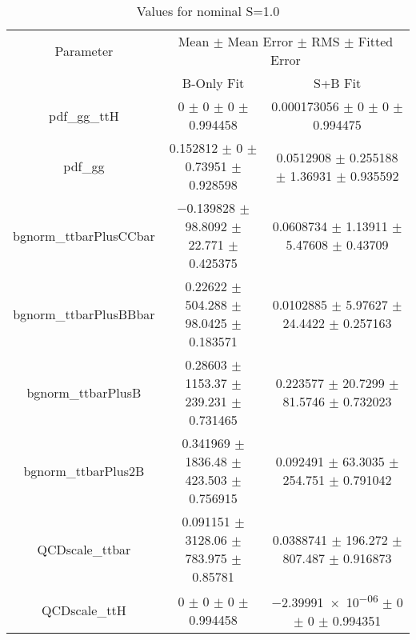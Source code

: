 \begin{table}
\centering
\caption{Values for nominal S=1.0}
\begin{tabular}{ccc}
\toprule
Parameter & \multicolumn{2}{c}{Mean $\pm$ Mean Error $\pm$ RMS $\pm$ Fitted Error}\\
 & B-Only Fit & S+B Fit\\
\midrule
pdf\_gg\_ttH & \num{0} $\pm$ \num{0} $\pm$ \num{0} $\pm$ \num{0.994458} & \num{0.000173056} $\pm$ \num{0} $\pm$ \num{0} $\pm$ \num{0.994475}\\
pdf\_gg & \num{0.152812} $\pm$ \num{0} $\pm$ \num{0.73951} $\pm$ \num{0.928598} & \num{0.0512908} $\pm$ \num{0.255188} $\pm$ \num{1.36931} $\pm$ \num{0.935592}\\
bgnorm\_ttbarPlusCCbar & \num{-0.139828} $\pm$ \num{98.8092} $\pm$ \num{22.771} $\pm$ \num{0.425375} & \num{0.0608734} $\pm$ \num{1.13911} $\pm$ \num{5.47608} $\pm$ \num{0.43709}\\
bgnorm\_ttbarPlusBBbar & \num{0.22622} $\pm$ \num{504.288} $\pm$ \num{98.0425} $\pm$ \num{0.183571} & \num{0.0102885} $\pm$ \num{5.97627} $\pm$ \num{24.4422} $\pm$ \num{0.257163}\\
bgnorm\_ttbarPlusB & \num{0.28603} $\pm$ \num{1153.37} $\pm$ \num{239.231} $\pm$ \num{0.731465} & \num{0.223577} $\pm$ \num{20.7299} $\pm$ \num{81.5746} $\pm$ \num{0.732023}\\
bgnorm\_ttbarPlus2B & \num{0.341969} $\pm$ \num{1836.48} $\pm$ \num{423.503} $\pm$ \num{0.756915} & \num{0.092491} $\pm$ \num{63.3035} $\pm$ \num{254.751} $\pm$ \num{0.791042}\\
QCDscale\_ttbar & \num{0.091151} $\pm$ \num{3128.06} $\pm$ \num{783.975} $\pm$ \num{0.85781} & \num{0.0388741} $\pm$ \num{196.272} $\pm$ \num{807.487} $\pm$ \num{0.916873}\\
QCDscale\_ttH & \num{0} $\pm$ \num{0} $\pm$ \num{0} $\pm$ \num{0.994458} & \num{-2.39991e-06} $\pm$ \num{0} $\pm$ \num{0} $\pm$ \num{0.994351}\\
\bottomrule
\end{tabular}
\end{table}